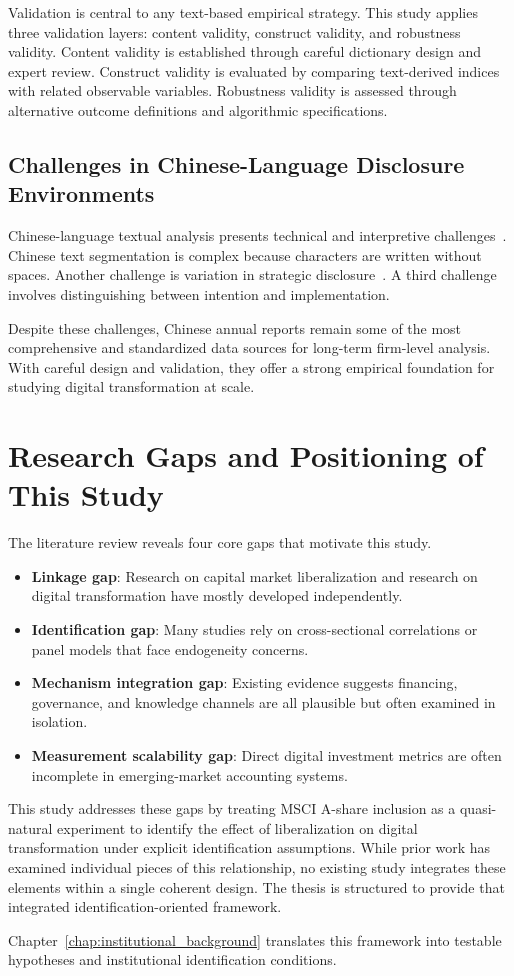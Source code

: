 Validation is central to any text-based empirical strategy. This study applies three validation layers: content validity, construct validity, and robustness validity. Content validity is established through careful dictionary design and expert review. Construct validity is evaluated by comparing text-derived indices with related observable variables. Robustness validity is assessed through alternative outcome definitions and algorithmic specifications.

\subsection{Challenges in Chinese-Language Disclosure Environments}

Chinese-language textual analysis presents technical and interpretive challenges~\cite{YLi2023,Wang2022}. Chinese text segmentation is complex because characters are written without spaces. Another challenge is variation in strategic disclosure~\cite{Yang2024}. A third challenge involves distinguishing between intention and implementation.

Despite these challenges, Chinese annual reports remain some of the most comprehensive and standardized data sources for long-term firm-level analysis. With careful design and validation, they offer a strong empirical foundation for studying digital transformation at scale.

\section{Research Gaps and Positioning of This Study}

The literature review reveals four core gaps that motivate this study.

\begin{itemize}
    \item \textbf{Linkage gap}: Research on capital market liberalization and research on digital transformation have mostly developed independently.
    \item \textbf{Identification gap}: Many studies rely on cross-sectional correlations or panel models that face endogeneity concerns.
    \item \textbf{Mechanism integration gap}: Existing evidence suggests financing, governance, and knowledge channels are all plausible but often examined in isolation.
    \item \textbf{Measurement scalability gap}: Direct digital investment metrics are often incomplete in emerging-market accounting systems.
\end{itemize}

This study addresses these gaps by treating MSCI A-share inclusion as a quasi-natural experiment to identify the effect of liberalization on digital transformation under explicit identification assumptions. While prior work has examined individual pieces of this relationship, no existing study integrates these elements within a single coherent design. The thesis is structured to provide that integrated identification-oriented framework.

Chapter~\ref{chap:institutional_background} translates this framework into testable hypotheses and institutional identification conditions.
